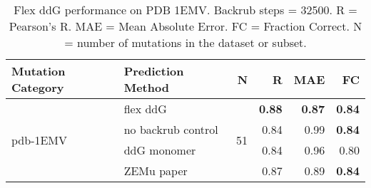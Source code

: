 \begin{table}
  \begin{tabular}{llrrrr}
\toprule
Mutation Category &   Prediction Method &   N &    R &  MAE &   FC \\
\midrule
 \multirow{ 4}{*}{pdb-1EMV} & flex ddG & \multirow{ 4}{*}{51} & \textbf{0.88} & \textbf{0.87} & \textbf{0.84}  \\
 & no backrub control & & 0.84 & 0.99 & \textbf{0.84}  \\
 & ddG monomer & & 0.84 & 0.96 & 0.80  \\
 & ZEMu paper & & 0.87 & 0.89 & \textbf{0.84}  \\
\bottomrule
\end{tabular}
  \caption[Flex ddG performance on PDB 1EMV]{
    Flex ddG performance on PDB 1EMV. Backrub steps = 32500. R = Pearson's R. MAE = Mean Absolute Error. FC = Fraction Correct. N = number of mutations in the dataset or subset.
  } \label{tab:table-pdb-1EMV}
\end{table}
